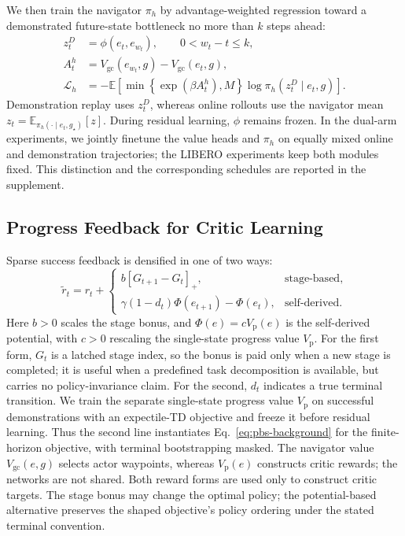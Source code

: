 \documentclass[letterpaper]{article} %
\begin{document}
We then train the navigator $\pi_h$ by advantage-weighted regression toward a
demonstrated future-state bottleneck no more than $k$ steps ahead:
\begin{equation}
\begin{aligned}
z_t^D&=\phi(e_t,e_{w_t}),\qquad 0<w_t-t\leq k,\\
A_t^h&=V_{\mathrm{gc}}(e_{w_t},g)-V_{\mathrm{gc}}(e_t,g),\\
\mathcal L_h
&=-\mathbb E\!\left[
\min\!\left\{\exp(\beta A_t^h),M\right\}
\log\pi_h(z_t^D\mid e_t,g)\right].
\end{aligned}
\label{eq:navigator-awr}
\end{equation}
Demonstration replay uses $z_t^D$, whereas online rollouts use the navigator
mean $z_t=\mathbb E_{\pi_h(\cdot\mid e_t,g_\star)}[z]$. During residual
learning, $\phi$ remains frozen. In the dual-arm experiments, we jointly
finetune the value heads and $\pi_h$ on equally mixed online and demonstration
trajectories; the LIBERO experiments keep both modules fixed. This distinction
and the corresponding schedules are reported in the supplement.

\subsection{Progress Feedback for Critic Learning}
\label{sec:pot}
Sparse success feedback is densified in one of two ways:
\begin{equation}
\widetilde r_t
=r_t+
\begin{cases}
 b[G_{t+1}-G_t]_+, & \text{stage-based},\\
 \gamma(1-d_t)\Phi(e_{t+1})-\Phi(e_t),
 & \text{self-derived}.
\end{cases}
\label{eq:shore-dense-reward}
\end{equation}
Here $b>0$ scales the stage bonus, and $\Phi(e)=cV_{\mathrm p}(e)$ is the
self-derived potential, with $c>0$ rescaling the single-state progress value
$V_{\mathrm p}$. For the first form, $G_t$ is a latched stage
index, so the bonus is paid only when a new stage is completed; it is useful
when a predefined task decomposition is available, but carries no
policy-invariance claim. For the second, $d_t$ indicates a true terminal
transition. We train the
separate single-state progress value $V_{\mathrm p}$ on successful
demonstrations with an expectile-TD objective and freeze it before residual
learning. Thus the second line instantiates Eq.~\eqref{eq:pbs-background} for
the finite-horizon objective, with terminal bootstrapping masked. The navigator value
$V_{\mathrm{gc}}(e,g)$ selects actor waypoints, whereas $V_{\mathrm p}(e)$
constructs critic rewards; the networks are not shared. Both reward forms are
used only to construct critic targets. The stage bonus may change the optimal
policy; the potential-based alternative preserves the shaped objective's
policy ordering under the stated terminal convention.
\end{document}
